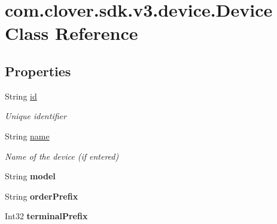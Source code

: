 \hypertarget{classcom_1_1clover_1_1sdk_1_1v3_1_1device_1_1_device}{}\section{com.\+clover.\+sdk.\+v3.\+device.\+Device Class Reference}
\label{classcom_1_1clover_1_1sdk_1_1v3_1_1device_1_1_device}
\subsection*{Properties}
\begin{DoxyCompactItemize}
\item 
String \hyperlink{classcom_1_1clover_1_1sdk_1_1v3_1_1device_1_1_device_a7761d81a6f1d36b03d8470a891f5b770}{id}
\begin{DoxyCompactList}\small\item\em Unique identifier \end{DoxyCompactList}\item 
String \hyperlink{classcom_1_1clover_1_1sdk_1_1v3_1_1device_1_1_device_a139990e0d2f93f390e3f4954fb3bd4d9}{name}
\begin{DoxyCompactList}\small\item\em Name of the device (if entered) \end{DoxyCompactList}\item 
\mbox{\label{classcom_1_1clover_1_1sdk_1_1v3_1_1device_1_1_device_aff3bc368e4273c75480116f67b176da2}} 
String {\bfseries model}
\item 
\mbox{\label{classcom_1_1clover_1_1sdk_1_1v3_1_1device_1_1_device_a68f555035f958e442ca7d3481b48e5c0}} 
String {\bfseries order\+Prefix}
\item 
\mbox{\label{classcom_1_1clover_1_1sdk_1_1v3_1_1device_1_1_device_a1bdda2f082c1908ea74c3b120e3e961f}} 
Int32 {\bfseries terminal\+Prefix}

\end{DoxyCompactItemize}
